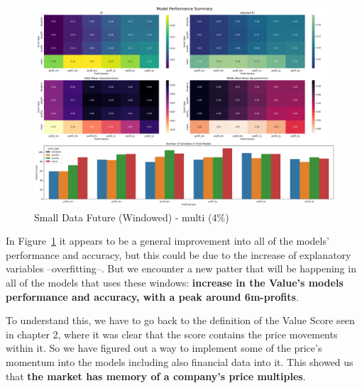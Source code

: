 \documentclass[11pt,english,a4paper,hidelinks]{book}
\begin{document}
\begin{figure}[H]
    \centering
    \includegraphics[width=1\textwidth]{images/code/models/linear_regression/third_model/Small Data future - Multi performance.png}
    \caption{Small Data Future (Windowed) - \acrshort{multi} (4\%)}
    \label{fig:third_linear_regression_summary}
\end{figure}

\noindent In Figure~\ref{fig:third_linear_regression_summary} it appears to be a general improvement into all of the models' performance and accuracy, but this could be due to the increase of explanatory variables --overfitting--. But we encounter a new patter that will be happening in all of the models that uses these windows: \textbf{increase in the Value's models performance and accuracy, with a peak around 6m-profits}.

\vspace{0.5cm}
\noindent To understand this, we have to go back to the definition of the Value Score seen in chapter 2, where it was clear that the score contains the price movements within it. So we have figured out a way to implement some of the price's momentum into the models including also financial data into it. This showed us that \textbf{the market has memory of a company's price multiples}.
\end{document}
